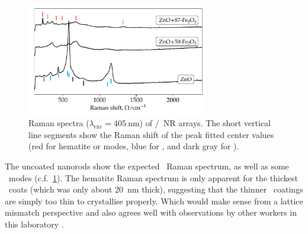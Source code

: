 \documentclass[webedition,openright,titles,swedish,english]{LuaUUThesis}\usepackage[]{graphicx}\usepackage[]{xcolor}
\newenvironment{knitrout}{}{} %
\newcommand{\cf}{c.f.}
\begin{document}
%















\begin{figure}[tbp]
\centering
\begin{knitrout}\scriptsize
{}\color{fgcolor}

{\centering \includegraphics[width=3.12in]{figure/0503P-fig-Raman-405nm-stacked-1} 

}


\end{knitrout}
\caption[Raman spectra of \zincox/\ironox\ nanorod arrays]{%
   Raman spectra ($\lambda_\text{exc}=\qty{405}{\nm}$) of
   \zincox/\ironox\ \protect\gls{NR} arrays.
   The short vertical line segments show the Raman shift of the peak fitted
   center values (red for hematite or  modes, blue for \ZnO,
   and dark gray for \tinox).}
\label{fig:P03-Raman-405nm-stacked}
\end{figure}

The uncoated nanorods show the expected \ZnO\ Raman spectrum, as well as some
\tinox\ modes (\cf\ \cref{fig:P03-Raman-405nm-stacked}).
The hematite Raman spectrum is only apparent for the thickest \ironox\ coats
(which was only about \qty{20}{\nm} thick),
suggesting that the thinner \ironox\ coatings are simply too thin to crystallise
properly. Which would make sense from a lattice mismatch perspective and also
agrees well with observations by other workers in this laboratory \cite{Fondell2014,Jogi2015}.

%
\end{document}
